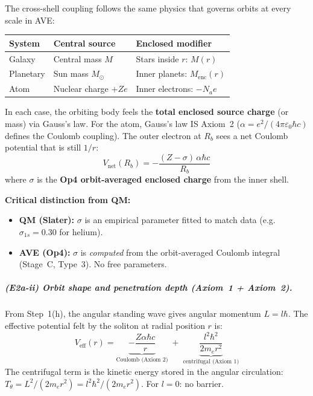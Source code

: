 The cross-shell coupling follows the same physics that
governs orbits at every scale in AVE:
\begin{center}
\small
\renewcommand{\arraystretch}{1.2}
\begin{tabular}{lll}
\hline
\textbf{System} & \textbf{Central source} & \textbf{Enclosed modifier} \\
\hline
Galaxy & Central mass $M$ & Stars inside $r$: $M(r)$ \\
Planetary & Sun mass $M_\odot$ & Inner planets: $M_{\text{enc}}(r)$ \\
Atom & Nuclear charge $+Ze$ & Inner electrons: $-N_a e$ \\
\hline
\end{tabular}
\end{center}
In each case, the orbiting body feels the \textbf{total
enclosed source charge} (or mass) via Gauss's law.
For the atom, Gauss's law IS Axiom~2
($\alpha = e^2/(4\pi\varepsilon_0\hbar c)$ defines the
Coulomb coupling).  The outer electron at $R_b$
sees a net Coulomb potential that is still $1/r$:
\begin{equation}
    V_{\text{net}}(R_b) = -\frac{(Z - \sigma)\,\alpha\hbar c}{R_b}
    \label{eq:V_net}
\end{equation}
where $\sigma$ is the \textbf{Op4 orbit-averaged enclosed
charge} from the inner shell.

\noindent\textbf{Critical distinction from QM:}
\begin{itemize}
    \item \textbf{QM (Slater):} $\sigma$ is an empirical
          parameter fitted to match data (e.g.\
          $\sigma_{1s} = 0.30$ for helium).
    \item \textbf{AVE (Op4):} $\sigma$ is \emph{computed}
          from the orbit-averaged Coulomb integral
          (Stage~C, Type~3).  No free parameters.
\end{itemize}

\subparagraph{(E2a-ii) Orbit shape and penetration depth
(Axiom~1 + Axiom~2).}

From Step~1(h), the angular standing wave
gives angular momentum $L = l\hbar$.
The effective potential felt by the soliton
at radial position $r$ is:
\begin{equation}
    V_{\text{eff}}(r)
    = \underbrace{-\frac{Z\alpha\hbar c}{r}}_
    {\text{Coulomb (Axiom~2)}}
    \;+\; \underbrace{\frac{l^2\hbar^2}{2 m_e r^2}}_
    {\text{centrifugal (Axiom~1)}}
    \label{eq:V_eff}
\end{equation}
The centrifugal term is the kinetic energy stored
in the angular circulation: $T_\theta = L^2/(2m_e r^2)
= l^2\hbar^2/(2m_e r^2)$.  For $l = 0$: no barrier.

